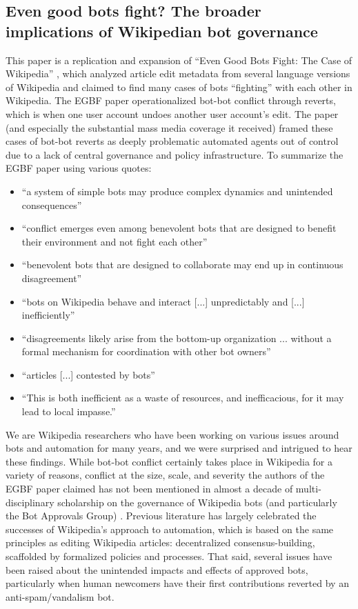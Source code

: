 \documentclass[format=acmsmall, review=false, screen=true]{acmart}%
\begin{document}
\subsection{Even good bots fight? The broader implications of Wikipedian bot governance}
  
This paper is a replication and expansion of ``Even Good Bots Fight: The Case of Wikipedia'' \cite{Tsvetkova2017}, which analyzed article edit metadata from several language versions of Wikipedia and claimed to find many cases of bots ``fighting'' with each other in Wikipedia. The EGBF paper operationalized bot-bot conflict through reverts, which is when one user account undoes another user account's edit. The paper (and especially the substantial mass media coverage it received) framed these cases of bot-bot reverts as deeply problematic automated agents out of control due to a lack of central governance and policy infrastructure. To summarize the EGBF paper using various quotes:

\begin{itemize}
\item ``a system of simple bots may produce complex dynamics and unintended consequences''  
\item ``conflict emerges even among benevolent bots that are designed to benefit their environment and not fight each other''
\item ``benevolent bots that are designed to collaborate may end up in continuous disagreement''  
\item ``bots on Wikipedia behave and interact [...] unpredictably and [...] inefficiently''  
\item ``disagreements likely arise from the bottom-up organization ... without a formal mechanism for coordination with other bot owners''  
\item ``articles [...] contested by bots''  
\item ``This is both inefficient as a waste of resources, and inefficacious, for it may lead to local impasse.''  
\end{itemize}

We are Wikipedia researchers who have been working on various issues around bots and automation for many years, and we were surprised and intrigued to hear these findings. While bot-bot conflict certainly takes place in Wikipedia for a variety of reasons, conflict at the size, scale, and severity the authors of the EGBF paper claimed has not been mentioned in almost a decade of multi-disciplinary scholarship on the governance of Wikipedia bots (and particularly the Bot Approvals Group) \cite{Bruckman2008, Geiger2011a, Halfaker2012, Kennedy2010, DeLaat2015,Livingstone2016, Niederer2010}. Previous literature has largely celebrated the successes of Wikipedia's approach to automation, which is based on the same principles as editing Wikipedia articles: decentralized consensus-building, scaffolded by formalized policies and processes. That said, several issues have been raised about the unintended impacts and effects of approved bots, particularly when human newcomers have their first contributions reverted by an anti-spam/vandalism bot. \cite{Geiger2012, Halfaker2013} 
\end{document}
